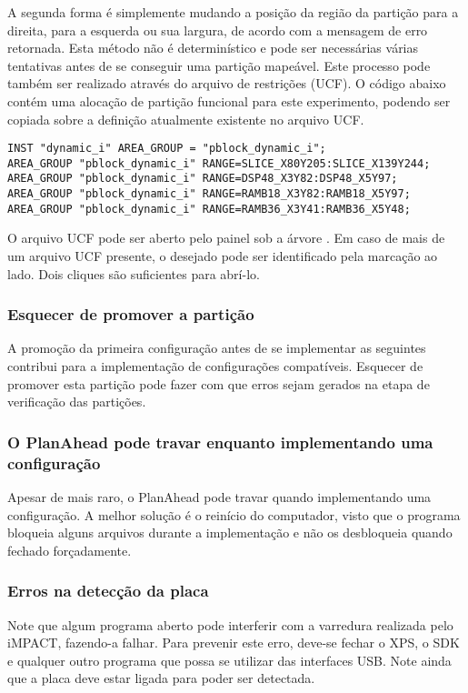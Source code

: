 \documentclass[11pt,a4paper,oneside]{book}
\begin{document}
A segunda forma é simplemente mudando a posição da região da partição para a direita, para a esquerda ou sua largura, de acordo com a mensagem de erro retornada.
Esta método não é determinístico e pode ser necessárias várias tentativas antes de se conseguir uma partição mapeável. 
Este processo pode também ser realizado através do arquivo de restrições (UCF).
O código abaixo contém uma alocação de partição funcional para este experimento, podendo ser copiada sobre a definição atualmente existente no arquivo UCF.
\begin{lstlisting}
INST "dynamic_i" AREA_GROUP = "pblock_dynamic_i";
AREA_GROUP "pblock_dynamic_i" RANGE=SLICE_X80Y205:SLICE_X139Y244;
AREA_GROUP "pblock_dynamic_i" RANGE=DSP48_X3Y82:DSP48_X5Y97;
AREA_GROUP "pblock_dynamic_i" RANGE=RAMB18_X3Y82:RAMB18_X5Y97;
AREA_GROUP "pblock_dynamic_i" RANGE=RAMB36_X3Y41:RAMB36_X5Y48;
\end{lstlisting}

O arquivo UCF pode ser aberto pelo painel  sob a árvore .
Em caso de mais de um arquivo UCF presente, o desejado pode ser identificado pela marcação  ao lado.
Dois cliques são suficientes para abrí-lo. 

\subsubsection{Esquecer de promover a partição}
A promoção da primeira configuração antes de se implementar as seguintes contribui para a implementação de configurações compatíveis.
Esquecer de promover esta partição pode fazer com que erros sejam gerados na etapa de verificação das partições.

\subsubsection{O PlanAhead pode travar enquanto implementando uma configuração}
Apesar de mais raro, o PlanAhead pode travar quando implementando uma configuração.
A melhor solução é o reinício do computador, visto que o programa bloqueia alguns arquivos durante a implementação e não os desbloqueia quando fechado forçadamente.

\subsubsection{Erros na detecção da placa}
Note que algum programa aberto pode interferir com a varredura realizada pelo iMPACT, fazendo-a falhar.
Para prevenir este erro, deve-se fechar o XPS, o SDK e qualquer outro programa que possa se utilizar das interfaces USB.
Note ainda que a placa deve estar ligada para poder ser detectada.
\end{document}
